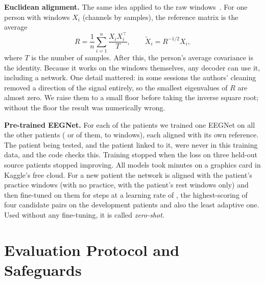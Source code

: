 \textbf{Euclidean alignment.} The same idea applied to the raw windows~\cite{he2020}. For
one person with windows $X_i$ (channels by samples), the reference matrix is the average
\begin{equation}
  R = \frac{1}{n}\sum_{i=1}^{n} \frac{X_i X_i^{\top}}{T}, \qquad \tilde{X}_i = R^{-1/2} X_i ,
\end{equation}
where $T$ is the number of samples. After this, the person's average covariance is the
identity. Because it works on the windows themselves, any decoder can use it, including a
network. One detail mattered: in some sessions the
authors' cleaning removed a direction of the signal entirely, so the smallest
eigenvalues of $R$ are almost zero. We raise them to a small floor before taking the
inverse square root; without the floor the result was numerically wrong.


\textbf{Pre-trained EEGNet.} For each of the \dlPretrainModels{} patients we trained one
EEGNet on all the other patients (\dlPretrainSourcesMin{} or \dlPretrainSourcesMax{} of
them, \dlPretrainWindowsMin{} to \dlPretrainWindowsMax{} windows), each aligned with its
own reference. The patient being tested, and the patient linked to it, were never in
this training data, and the code checks this. Training stopped when the loss on three
held-out source patients stopped improving. All \dlPretrainModels{} models took
\dlPretrainMinutes{} minutes on a \dlPretrainDevice{} graphics card in Kaggle's free cloud.
For a new patient the network is aligned with the patient's practice windows (with no
practice, with the patient's rest windows only) and then fine-tuned on them for
\rqTwoHparamEegnetEpochs{} steps at a learning rate of \rqTwoHparamEegnetLr{}, the
highest-scoring of four candidate pairs on the development patients and also the least
adaptive one. Used without any fine-tuning, it is called \emph{zero-shot}.

\section{Evaluation Protocol and Safeguards}\label{sec:protocol}

